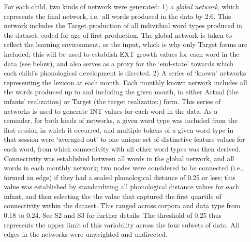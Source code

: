 \documentclass[
  man]{apa6}
\begin{document}
For each child, two kinds of network were generated: 1) a \emph{global network}, which represents the final network, i.e.~all words produced in the data by 2;6. This network includes the Target production of all individual word types produced in the dataset, coded for age of first production. The global network is taken to reflect the learning environment, or the input, which is why only Target forms are included; this will be used to establish EXT growth values for each word in the data (see below), and also serves as a proxy for the `end-state' towards which each child's phonological development is directed. 2) A series of `known' networks representing the lexicon at each month. Each monthly known network includes all the words produced up to and including the given month, in either Actual (the infants' realization) or Target (the target realization) form. This series of networks is used to generate INT values for each word in the data. As a reminder, for both kinds of networks, a given word type was included from the first session in which it occurred, and multiple tokens of a given word type in that session were `averaged out' to one unique set of distinctive feature values for each word, from which connectivity with all other word types was then derived. Connectivity was established between all words in the global network, and all words in each monthly network; two nodes were considered to be connected (i.e., formed an edge) if they had a scaled phonological distance of 0.25 or less; this value was established by standardizing all phonological distance values for each infant, and then selecting the the value that captured the first quartile of connectivity within the dataset. This ranged across corpora and data type from 0.18 to 0.24. See S2 and S3 for further details. The threshold of 0.25 thus represents the upper limit of this variability across the four subsets of data. All edges in the networks were unweighted and undirected.
\end{document}
